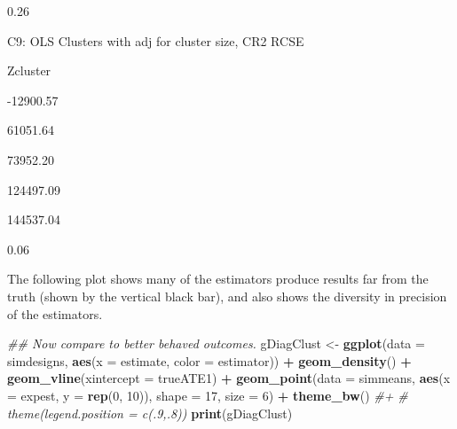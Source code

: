 \documentclass[
  12pt,
]{book}
\newenvironment{Shaded}{\begin{snugshade}}{\end{snugshade}}
\newcommand{\CommentTok}[1]{\textcolor[rgb]{0.56,0.35,0.01}{\textit{#1}}}
\newcommand{\DataTypeTok}[1]{\textcolor[rgb]{0.13,0.29,0.53}{#1}}
\newcommand{\DecValTok}[1]{\textcolor[rgb]{0.00,0.00,0.81}{#1}}
\newcommand{\KeywordTok}[1]{\textcolor[rgb]{0.13,0.29,0.53}{\textbf{#1}}}
\newcommand{\NormalTok}[1]{#1}
\newcommand{\OperatorTok}[1]{\textcolor[rgb]{0.81,0.36,0.00}{\textbf{#1}}}
\newcommand{\StringTok}[1]{\textcolor[rgb]{0.31,0.60,0.02}{#1}}
\theoremstyle{definition}
\theoremstyle{definition}
\theoremstyle{definition}
\theoremstyle{remark}
\begin{document}
0.26

C9: OLS Clusters with adj for cluster size, CR2 RCSE

Zcluster

-12900.57

61051.64

73952.20

124497.09

144537.04

0.06

\begin{Shaded}
\end{Shaded}

The following plot shows many of the estimators produce results far from
the truth (shown by the vertical black bar), and also shows the
diversity in precision of the estimators.

\begin{Shaded}
\begin{Highlighting}[]
\CommentTok{## Now compare to better behaved outcomes.}
\NormalTok{gDiagClust <-}\StringTok{ }\KeywordTok{ggplot}\NormalTok{(}\DataTypeTok{data =}\NormalTok{ simdesigns, }\KeywordTok{aes}\NormalTok{(}\DataTypeTok{x =}\NormalTok{ estimate, }\DataTypeTok{color =}\NormalTok{ estimator)) }\OperatorTok{+}
\StringTok{  }\KeywordTok{geom_density}\NormalTok{() }\OperatorTok{+}
\StringTok{  }\KeywordTok{geom_vline}\NormalTok{(}\DataTypeTok{xintercept =}\NormalTok{ trueATE1) }\OperatorTok{+}
\StringTok{  }\KeywordTok{geom_point}\NormalTok{(}\DataTypeTok{data =}\NormalTok{ simmeans, }\KeywordTok{aes}\NormalTok{(}\DataTypeTok{x =}\NormalTok{ expest, }\DataTypeTok{y =} \KeywordTok{rep}\NormalTok{(}\DecValTok{0}\NormalTok{, }\DecValTok{10}\NormalTok{)), }\DataTypeTok{shape =} \DecValTok{17}\NormalTok{, }\DataTypeTok{size =} \DecValTok{6}\NormalTok{) }\OperatorTok{+}
\StringTok{  }\KeywordTok{theme_bw}\NormalTok{() }\CommentTok{#+}
\CommentTok{# theme(legend.position = c(.9,.8))}
\KeywordTok{print}\NormalTok{(gDiagClust)}
\end{Highlighting}
\end{Shaded}
\end{document}
